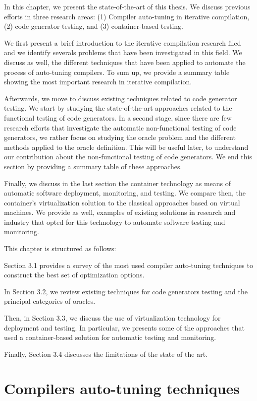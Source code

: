 
In this chapter, we present the state-of-the-art of this thesis. We discuss previous efforts in three research areas: (1) Compiler auto-tuning in iterative compilation, (2) code generator testing, and (3) container-based testing.

We first present a brief introduction to the iterative compilation research filed and we identify severals problems that have been investigated in this field. We discuss as well, the different techniques that have been applied to automate the process of auto-tuning compilers. To sum up, we provide a summary table showing the most important research in iterative compilation.

Afterwards, we move to discuss existing techniques related to code generator testing. We start by studying the state-of-the-art approaches related to the functional testing of code generators. In a second stage, since there are few research efforts that investigate the automatic non-functional testing of code generators, we rather focus on studying the oracle problem and the different methods applied to the oracle definition. This will be useful later, to understand our contribution about the non-functional testing of code generators. We end this section by providing a summary table of these approaches.

Finally, we discuss in the last section the container technology as means of automatic software deployment, monitoring, and testing. We compare then, the container's virtualization solution to the classical approaches based on virtual machines. We provide as well, examples of existing solutions in research and industry that opted for this technology to automate software testing and monitoring.

This chapter is structured as follows: 

Section 3.1 provides a survey of the most used compiler auto-tuning techniques to construct the best set of optimization options. 

In Section 3.2, we review existing techniques for code generators testing and the principal categories of oracles. 

Then, in Section 3.3, we discuss the use of virtualization technology for deployment and testing. In particular, we presents some of the approaches that used a container-based solution for automatic testing and monitoring. 

Finally, Section 3.4 discusses the limitations of the state of the art.

\section{Compilers auto-tuning techniques}

